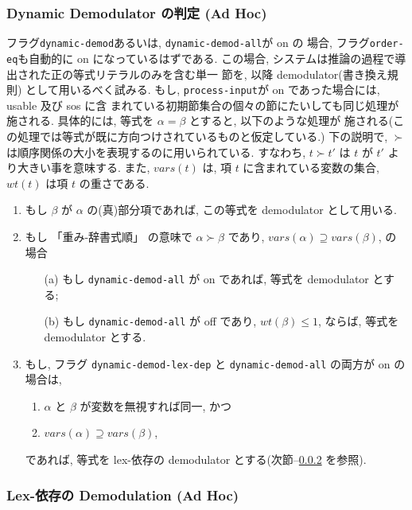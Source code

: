 \subsubsection{Dynamic Demodulator の判定 (Ad Hoc)}  \label{sec:dynamic}

フラグ\texttt{dynamic-demod}あるいは, \texttt{dynamic-demod-all}が on の
場合, フラグ\texttt{order-eq}も自動的に on になっているはずである.  
この場合, システムは推論の過程で導出された正の等式リテラルのみを含む単一
節を, 以降 demodulator(書き換え規則) として用いるべく試みる. 
もし, \texttt{process-input}が on であった場合には, usable 及び sos に含
まれている初期節集合の個々の節にたいしても同じ処理が施される.
具体的には, 等式を $\alpha=\beta$ とすると, 以下のような処理が
施される(この処理では等式が既に方向つけされているものと仮定している.)
下の説明で, $\succ$ は順序関係の大小を表現するのに用いられている.
すなわち, $t \succ t'$ は $t$ が $t'$ より大きい事を意味する.
また, $vars(t)$ は, 項 $t$ に含まれている変数の集合,
$wt(t)$ は項 $t$ の重さである.
\begin{enumerate}
\item もし $\beta$ が $\alpha$ の(真)部分項であれば,
  この等式を demodulator として用いる.

\item もし 「重み-辞書式順」 の意味で $\alpha\succ\beta$ であり,
  $vars(\alpha) \supseteq vars(\beta)$, の場合
  \begin{itemize}
  \item[(a)]
    もし \texttt{dynamic-demod-all} が on であれば, 等式を
    demodulator とする;
  \item[(b)]
    もし \texttt{dynamic-demod-all} が off であり, $wt(\beta) \leq 1$, 
    ならば, 等式を demodulator とする.
  \end{itemize}

\item  もし, フラグ \texttt{dynamic-demod-lex-dep} と
  \texttt{dynamic-demod-all} の両方が on の場合は, 
  \begin{enumerate}
  \item $\alpha$ と $\beta$ が変数を無視すれば同一, かつ
  \item $vars(\alpha) \supseteq vars(\beta)$,
  \end{enumerate}
  であれば, 等式を lex-依存の demodulator とする(次節--\ref{sec:lex-dep}
  を参照).
\end{enumerate}

\subsubsection{Lex-依存の Demodulation (Ad Hoc)} \label{sec:lex-dep}

